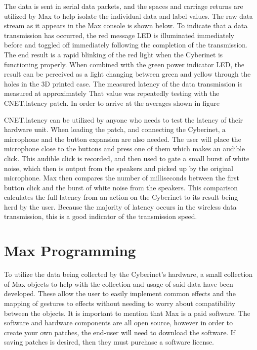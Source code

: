 The data is sent in serial data packets, and the spaces and carriage returns are utilized by Max to help isolate the individual data and label values. The raw data stream as it appears in the Max console is shown below. To indicate that a data transmission has occurred, the red message LED is illuminated immediately before and toggled off immediately following the completion of the transmission. The end result is a rapid blinking of the red light when the Cyberinet is functioning properly. When combined with the green power indicator LED, the result can be perceived as a light changing between green and yellow through the holes in the 3D printed case. The measured latency of the data transmission is measured at approximately %
That value was repeatedly testing with the CNET.latency patch. In order to arrive at the averages shown in figure %

CNET.latency can be utilized by anyone who needs to test the latency of their hardware unit. When loading the patch, and connecting the Cyberinet, a microphone and the button expansion are also needed. The user will place the microphone close to the buttons and press one of them which makes an audible click. This audible click is recorded, and then used to gate a small burst of white noise, which then is output from the speakers and picked up by the original microphone. Max then compares the number of milliseconds between the first button click and the burst of white noise from the speakers. This comparison calculates the full latency from an action on the Cyberinet to its result being herd by the user. Because the majority of latency occurs in the wireless data transmission, this is a good indicator of the transmission speed.  

\section{Max Programming}

To utilize the data being collected by the Cyberinet’s hardware, a small collection of Max objects to help with the collection and usage of said data have been developed. These allow the user to easily implement common effects and the mapping of gestures to effects without needing to worry about compatibility between the objects. It is important to mention that Max is a paid software. The software and hardware components are all open source, however in order to create your own patches, the end-user will need to download the software. If saving patches is desired, then they must purchase a software license. 

